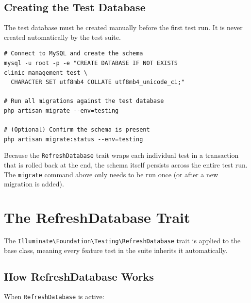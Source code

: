 \subsection{Creating the Test Database}

The test database must be created manually before the first test run.
It is never created automatically by the test suite.

\begin{lstlisting}[style=bash, caption={One-time setup: create the
  dedicated MySQL test database.}]
# Connect to MySQL and create the schema
mysql -u root -p -e "CREATE DATABASE IF NOT EXISTS clinic_management_test \
  CHARACTER SET utf8mb4 COLLATE utf8mb4_unicode_ci;"

# Run all migrations against the test database
php artisan migrate --env=testing

# (Optional) Confirm the schema is present
php artisan migrate:status --env=testing
\end{lstlisting}

Because the \texttt{RefreshDatabase} trait wraps each individual test
in a transaction that is rolled back at the end, the schema itself
persists across the entire test run. The \texttt{migrate} command above
only needs to be run once (or after a new migration is added).

\section{The RefreshDatabase Trait}
\label{sec:refresh-database}

The \texttt{Illuminate\textbackslash{}Foundation\textbackslash{}Testing\textbackslash{}RefreshDatabase}
trait is applied to the base \phpclass{TestCase} class, meaning every
feature test in the suite inherits it automatically.

\subsection{How RefreshDatabase Works}

When \texttt{RefreshDatabase} is active:

